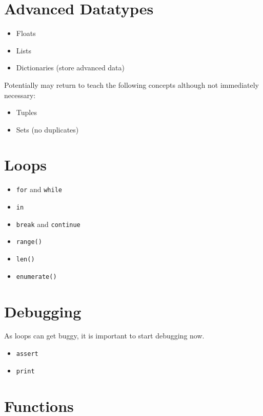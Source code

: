\documentclass{article}
\begin{document}
\section{Advanced Datatypes}

\begin{itemize}
    \item Floats  
    \item Lists
    \item Dictionaries (store advanced data)
\end{itemize}

Potentially may return to teach the following concepts although not immediately necessary:

\begin{itemize}
    \item Tuples
    \item Sets (no duplicates)
\end{itemize}

\section{Loops}

\begin{itemize}
    \item \verb|for| and \verb|while|
    \item \verb|in|
    \item \verb|break| and \verb|continue|
    \item \verb|range()|
    \item \verb|len()|
    \item \verb|enumerate()| 
\end{itemize}

\section{Debugging}
As loops can get buggy, it is important to start debugging now. \\

\begin{itemize}
    \item \verb|assert|
    \item \verb|print|
\end{itemize}

\section{Functions}
\end{document}
